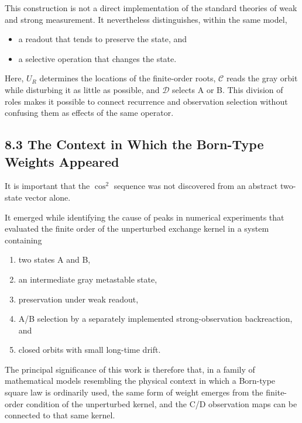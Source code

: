 \documentclass[
  a4paper,
  10pt]{article}
\providecommand{\tightlist}{%
  \setlength{\itemsep}{0pt}\setlength{\parskip}{0pt}}
\begin{document}
This construction is not a direct implementation of the standard
theories of weak and strong measurement. It nevertheless distinguishes,
within the same model,

\begin{itemize}
\tightlist
\item
  a readout that tends to preserve the state, and
\item
  a selective operation that changes the state.
\end{itemize}

Here, \(U_R\) determines the locations of the finite-order roots,
\(\mathcal C\) reads the gray orbit while disturbing it as little as
possible, and \(\mathcal D\) selects A or B. This division of roles
makes it possible to connect recurrence and observation selection
without confusing them as effects of the same operator.

\subsection{8.3 The Context in Which the Born-Type Weights
Appeared}\label{83-the-context-in-which-the-born-type-weights-appeared}

It is important that the \(\cos^2\) sequence was not discovered from an
abstract two-state vector alone.

It emerged while identifying the cause of peaks in numerical experiments
that evaluated the finite order of the unperturbed exchange kernel in a
system containing

\begin{enumerate}
\def\labelenumi{\arabic{enumi}.}
\tightlist
\item
  two states A and B,
\item
  an intermediate gray metastable state,
\item
  preservation under weak readout,
\item
  A/B selection by a separately implemented strong-observation
  backreaction, and
\item
  closed orbits with small long-time drift.
\end{enumerate}

The principal significance of this work is therefore that, in a family
of mathematical models resembling the physical context in which a
Born-type square law is ordinarily used, the same form of weight emerges
from the finite-order condition of the unperturbed kernel, and the C/D
observation maps can be connected to that same kernel.
\end{document}
